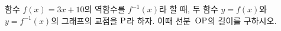 함수 $f(x)=3x+10$의 역함수를 $f^{-1}(x)$라 할 때, 두 함수 $y=f(x)$와 $y=f^{-1}(x)$의 그래프의 교점을 $\mathrm{P}$라 하자. 이때 선분~$\mathrm{OP}$의 길이를 구하시오. 
